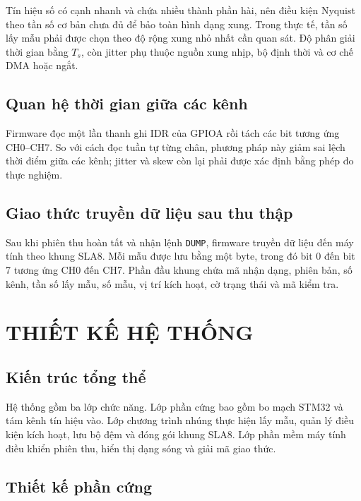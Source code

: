 Tín hiệu số có cạnh nhanh và chứa nhiều thành phần hài, nên điều kiện Nyquist theo tần số cơ bản chưa đủ để bảo toàn hình dạng xung. Trong thực tế, tần số lấy mẫu phải được chọn theo độ rộng xung nhỏ nhất cần quan sát. Độ phân giải thời gian bằng \(T_s\), còn jitter phụ thuộc nguồn xung nhịp, bộ định thời và cơ chế DMA hoặc ngắt.

\section{Quan hệ thời gian giữa các kênh}\label{sec:timing}

Firmware đọc một lần thanh ghi IDR của GPIOA rồi tách các bit tương ứng CH0--CH7. So với cách đọc tuần tự từng chân, phương pháp này giảm sai lệch thời điểm giữa các kênh; jitter và skew còn lại phải được xác định bằng phép đo thực nghiệm.

\section{Giao thức truyền dữ liệu sau thu thập}\label{sec:protocol}

Sau khi phiên thu hoàn tất và nhận lệnh \texttt{DUMP}, firmware truyền dữ liệu đến máy tính theo khung SLA8. Mỗi mẫu được lưu bằng một byte, trong đó bit 0 đến bit 7 tương ứng CH0 đến CH7. Phần đầu khung chứa mã nhận dạng, phiên bản, số kênh, tần số lấy mẫu, số mẫu, vị trí kích hoạt, cờ trạng thái và mã kiểm tra.

\chapter{THIẾT KẾ HỆ THỐNG}\label{thiux1ebft-kux1ebf-hux1ec7-thux1ed1ng}

\section{Kiến trúc tổng thể}\label{sec:architecture}

Hệ thống gồm ba lớp chức năng. Lớp phần cứng bao gồm bo mạch STM32 và tám kênh tín hiệu vào. Lớp chương trình nhúng thực hiện lấy mẫu, quản lý điều kiện kích hoạt, lưu bộ đệm và đóng gói khung SLA8. Lớp phần mềm máy tính điều khiển phiên thu, hiển thị dạng sóng và giải mã giao thức.



\section{Thiết kế phần cứng}\label{thiux1ebft-kux1ebf-phux1ea7n-cux1ee9ng}

